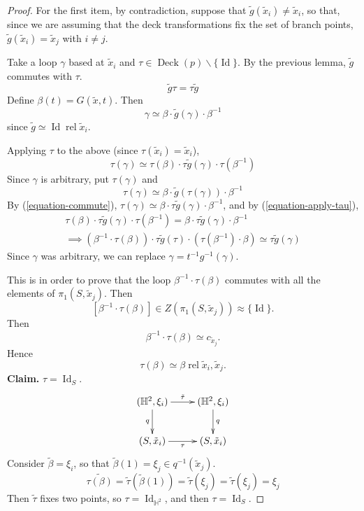 \begin{proof}
For the first item, by contradiction,
suppose that
$\tilde{g}(\tilde{x}_i)\neq\tilde{x}_i$,
so that, since we are assuming that the
deck transformations fix the set of
branch points,
$\tilde{g}(\tilde{x}_i)=\tilde{x}_j$
with $i\neq j$.

Take a loop $\gamma$ based at
$\tilde{x}_i$ and
$\tau\in\operatorname{Deck}(p)
\backslash\{\operatorname{Id}\}$.
By the previous lemma, $\tilde{g}$
commutes with $\tau$.
\begin{equation}
\label{equation-commute}
\tilde{g}\tau=\tau\tilde{g}
\end{equation}
Define $\beta(t)=G(\tilde{x},t)$. Then
$$
\gamma\simeq\beta\cdot\tilde{g}(\gamma)
\cdot\beta^{-1}
$$
since
$\tilde{g}\simeq\operatorname{Id}
\operatorname{rel}\tilde{x}_i$.

Applying $\tau$ to the above (since
$\tau(\tilde{x}_i)=\tilde{x}_i$),
\begin{equation}
\label{equation-apply-tau}
\tau(\gamma)\simeq\tau(\beta)\cdot
\tau\tilde{g}(\gamma)\cdot
\tau(\beta^{-1})
\end{equation}
Since $\gamma$ is arbitrary, put
$\tau(\gamma)$ and
\begin{equation}
\label{equation-replace-gamma}
\tau(\gamma)\simeq\beta\cdot
\tilde{g}(\tau(\gamma))\cdot\beta^{-1}
\end{equation}
By (\ref{equation-commute}),
$\tau(\gamma)\simeq\beta\cdot
\tau\tilde{g}(\gamma)\cdot\beta^{-1}$,
and by (\ref{equation-apply-tau}),
$$
\begin{aligned}
\tau(\beta)\cdot\tau\tilde{g}(\gamma)
\cdot\tau(\beta^{-1})
=\beta\cdot\tau\tilde{g}(\gamma)
\cdot\beta^{-1}\\
\implies(\beta^{-1}\cdot\tau(\beta))
\cdot\tau\tilde{g}(\tau)\cdot
(\tau(\beta^{-1})\cdot\beta)
\simeq\tau\tilde{g}(\gamma)
\end{aligned}
$$
Since $\gamma$ was arbitrary, we can
replace
$\gamma=t^{-1}g^{-1}(\gamma)$.

This is in order to prove that the loop
$\beta^{-1}\cdot\tau(\beta)$ commutes
with all the elements of
$\pi_1(S,\tilde{x}_j)$. Then
$$
[\beta^{-1}\cdot\tau(\beta)]\in
Z(\pi_1(S,\tilde{x}_j))\approx
\{\operatorname{Id}\}.
$$
Then
$$
\beta^{-1}\cdot\tau(\beta)\simeq
c_{\tilde{x}_j}.
$$
Hence
$$
\tau(\beta)\simeq\beta
\operatorname{rel}
\tilde{x}_i,\tilde{x}_j.
$$
{\bf Claim.} $\tau=\operatorname{Id}_S$.
$$
\xymatrix{
(\mathbb{H}^2,\xi_i)
  \ar[r]^{\tilde{\tau}} \ar[d]_{q}
  & (\mathbb{H}^2,\xi_i) \ar[d]^{q} \\
(S,\tilde{x}_i) \ar[r]_{\tau}
  & (S,\tilde{x}_i)
}
$$
Consider $\tilde{\beta}=\xi_i$, so that
$\tilde{\beta}(1)=\xi_j\in
q^{-1}(\tilde{x}_j)$.
$$
\widetilde{\tau(\beta)}
=\tilde{\tau}(\tilde{\beta}(1))
=\tilde{\tau}(\xi_j)
=\tilde{\tau}(\xi_j)=\xi_j
$$
Then $\tilde{\tau}$ fixes two points, so
$\tau=\operatorname{Id}_{\mathbb{H}^2}$,
and then $\tau=\operatorname{Id}_S$.


\end{proof}
